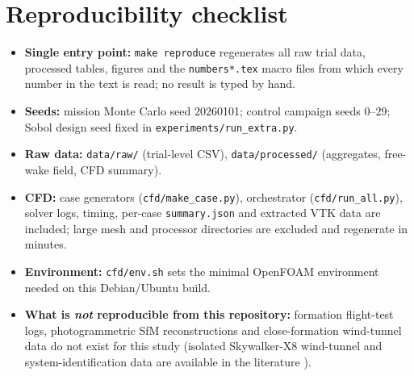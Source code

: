 \section{Reproducibility checklist}\label{app:repro}
\begin{itemize}
\item \textbf{Single entry point:} \texttt{make reproduce} regenerates all raw trial data, processed tables, figures and the \texttt{numbers*.tex} macro files from which every number in the text is read; no result is typed by hand.
\item \textbf{Seeds:} mission Monte Carlo seed 20260101; control campaign seeds 0--29; Sobol design seed fixed in \texttt{experiments/run\_extra.py}.
\item \textbf{Raw data:} \texttt{data/raw/} (trial-level CSV), \texttt{data/processed/} (aggregates, free-wake field, CFD summary).
\item \textbf{CFD:} case generators (\texttt{cfd/make\_case.py}), orchestrator (\texttt{cfd/run\_all.py}), solver logs, timing, per-case \texttt{summary.json} and extracted VTK data are included; large mesh and processor directories are excluded and regenerate in minutes.
\item \textbf{Environment:} \texttt{cfd/env.sh} sets the minimal OpenFOAM environment needed on this Debian/Ubuntu build.
\item \textbf{What is \emph{not} reproducible from this repository:} formation flight-test logs, photogrammetric SfM reconstructions and close-formation wind-tunnel data do not exist for this study (isolated Skywalker-X8 wind-tunnel and system-identification data are available in the literature \cite{gryte2018,reinhardt2022}).
\end{itemize}
